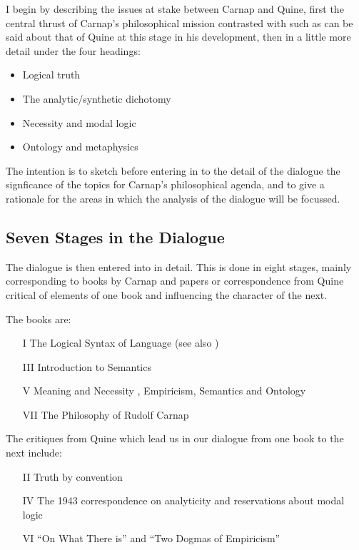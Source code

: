 I begin by describing the issues at stake between Carnap and Quine,
first the central thrust of Carnap's philosophical mission contrasted
with such as can be said about that of Quine at this stage in his
development, then in a little more detail under the four headings:

\begin{itemize}
\item Logical truth
\item The analytic/synthetic dichotomy
\item Necessity and modal logic
\item Ontology and metaphysics
\end{itemize}

The intention is to sketch before entering in to the detail of the dialogue
the signficance of the topics for Carnap's philosophical agenda, and
to give a rationale for the areas in which the analysis of the dialogue
will be focussed.

\subsection{Seven Stages in the Dialogue}

The dialogue is then entered into in detail.
This is done in eight stages, mainly corresponding to books by Carnap
and papers or correspondence from Quine critical of elements of one
book and influencing the character of the next.

The books are:

\begin{itemize}
\item[I] The Logical Syntax of Language \cite{carnap34,carnap37} (see also \cite{carnap35})
\item[III] Introduction to Semantics \cite{carnap42}
\item[V] Meaning and Necessity \cite{carnap47}, Empiricism, Semantics and Ontology \cite{carnap50}
\item[VII] The Philosophy of Rudolf Carnap \cite{carnap63}
\end{itemize}

The critiques from Quine which lead us in our dialogue from one
book to the next include:

\begin{itemize}
\item[II] Truth by convention \cite{quine36}
\item[IV] The 1943 correspondence on analyticity \cite{carnap90} and reservations about modal logic \cite{quine43,quine47}
\item[VI] ``On What There is'' \cite{quine51} and ``Two Dogmas of Empiricism'' \cite{quine51b}
\end{itemize}

